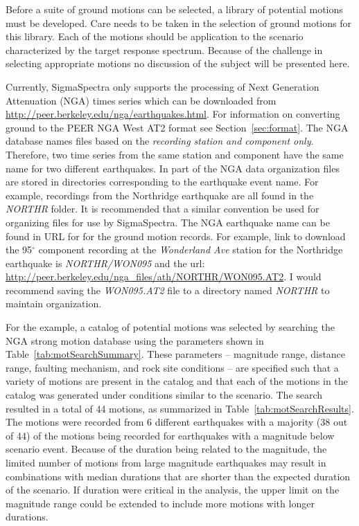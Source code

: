 \documentclass[11pt]{article}
\begin{document}
Before a suite of ground motions can be selected, a library of potential motions
must be developed.  Care needs to be taken in the selection of ground motions
for this library. Each of the motions should be application to the scenario
characterized by the target response spectrum. Because of the challenge in
selecting appropriate motions no discussion of the subject will be presented
here.

Currently, SigmaSpectra only supports the processing of Next Generation
Attenuation (NGA) times series which can be downloaded from
\url{http://peer.berkeley.edu/nga/earthquakes.html}. For information on
converting ground to the PEER NGA West AT2 format see
Section~\ref{sec:format}. The NGA database names files based on the
\emph{recording station and component only}. Therefore, two time series from the
same station and component have the same name for two different earthquakes. In
part of the NGA data organization files are stored in directories corresponding
to the earthquake event name. For example, recordings from the Northridge
earthquake are all found in the \emph{NORTHR} folder. It is recommended that a
similar convention be used for organizing files for use by SigmaSpectra. The NGA
earthquake name can be found in URL for for the ground motion records. For
example, link to download the 95$^\circ$ component recording at the
\emph{Wonderland Ave} station for the Northridge earthquake is
\emph{NORTHR/WON095} and the url:
\url{http://peer.berkeley.edu/nga\_files/ath/NORTHR/WON095.AT2}. I would
recommend saving the \emph{WON095.AT2} file to a directory named \emph{NORTHR}
to maintain organization.

For the example, a catalog of potential motions was selected by searching the
NGA strong motion database using the parameters shown in
Table~\ref{tab:motSearchSummary}. These parameters -- magnitude range, distance
range, faulting mechanism, and rock site conditions -- are specified such that a
variety of motions are present in the catalog and that each of the motions in
the catalog was generated under conditions similar to the scenario. The search
resulted in a total of 44 motions, as summarized in
Table~\ref{tab:motSearchResults}. The motions were recorded from 6 different
earthquakes with a majority (38 out of 44) of the motions being recorded for
earthquakes with a magnitude below scenario event. Because of the duration being
related to the magnitude, the limited number of motions from large magnitude
earthquakes may result in combinations with median durations that are shorter
than the expected duration of the scenario. If duration were critical in the
analysis, the upper limit on the magnitude range could be extended to include
more motions with longer durations.   
\end{document}
